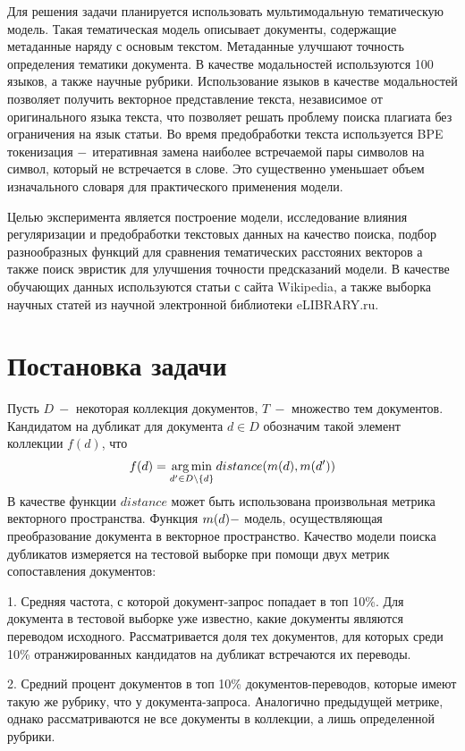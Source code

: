 \documentclass[12pt, twoside]{article}
\begin{document}
Для решения задачи планируется использовать мультимодальную тематическую модель. Такая тематическая модель описывает документы, содержащие метаданные наряду с основым текстом. Метаданные улучшают точность определения тематики документа. В качестве модальностей используются 100 языков, а также научные рубрики. Использование языков в качестве модальностей позволяет получить векторное представление текста, независимое от оригинального языка текста, что позволяет решать проблему поиска плагиата без ограничения на язык статьи. Во время предобработки текста используется BPE токенизация $\--$ итеративная замена наиболее встречаемой пары символов на символ, который не встречается в слове. Это существенно уменьшает объем изначального словаря для практического применения модели.

Целью эксперимента является построение модели, исследование влияния регуляризации и предобработки текстовых данных на качество поиска, подбор разнообразных функций для сравнения тематических расстояних векторов а также поиск эвристик для улучшения точности предсказаний модели. В качестве обучающих данных используются статьи с сайта Wikipedia, а также выборка научных статей из научной электронной библиотеки eLIBRARY.ru.

\section{Постановка задачи}

Пусть $D~-$ некоторая коллекция документов, $T~-$ множество тем документов. Кандидатом на дубликат  для документа $d \in D$ обозначим такой элемент коллекции $f(d)$, что  $$f(d) = \argmin_{d' \in D \setminus \{d\}} distance(m(d), m(d'))$$ 
В качестве функции $distance$ может быть использована произвольная метрика векторного пространства. Функция  $m(d) \--$ модель, осуществляющая преобразование документа в векторное пространство. Качество модели поиска дубликатов измеряется на тестовой выборке при помощи двух метрик сопоставления документов:

1. Средняя частота, с которой документ-запрос попадает в топ 10\%.  Для документа в тестовой выборке уже известно, какие документы являются переводом исходного. Рассматривается доля тех документов, для которых среди 10\% отранжированных кандидатов на дубликат встречаются их переводы. 

2. Средний процент документов в топ 10\% документов-переводов, которые имеют такую же рубрику, что у документа-запроса. Аналогично предыдущей метрике, однако рассматриваются не все документы в коллекции, а лишь определенной рубрики.
\end{document}
